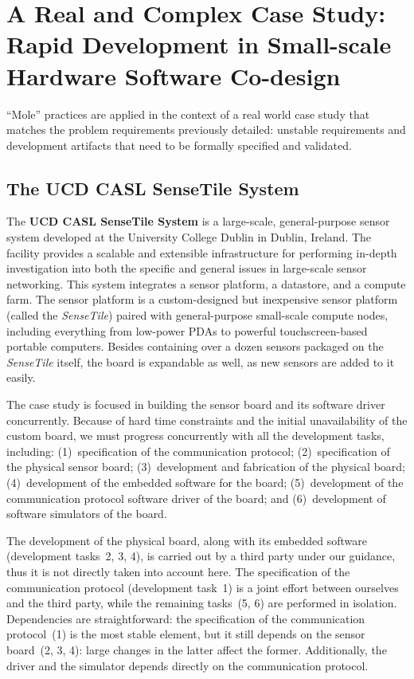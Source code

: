 \documentclass{article}
\newcommand{\ST}{\emph{SenseTile}\xspace}
\begin{document}
\section{A Real and Complex Case Study: \\ Rapid Development in Small-scale Hardware Software Co-design}
\label{subsec:a_real_and_complex_case_study}

``Mole'' practices are applied in the context of a real world case study that matches the problem requirements previously detailed: unstable requirements and development artifacts that need to be formally specified and validated.  

\subsection{The UCD CASL SenseTile System}
\label{sec:ucd-casl-sensetile}

The \textbf{UCD CASL SenseTile System} is a large-scale, general-purpose sensor system developed at the University College Dublin in Dublin, Ireland.  
The facility provides a scalable and extensible infrastructure for performing in-depth investigation into both the specific and general issues in large-scale sensor networking. 
This system integrates a sensor platform, a datastore, and a compute farm.  
The sensor platform is a custom-designed but inexpensive sensor platform (called the \ST) paired with general-purpose small-scale compute nodes, including everything from low-power PDAs to powerful touchscreen-based portable computers.  
Besides containing over a dozen sensors packaged on the \ST itself, the board is expandable as well, as new sensors are added to it easily.

The case study is focused in building the sensor board and its software driver concurrently.  
Because of hard time constraints and the initial unavailability of the custom board, we must progress concurrently with all the development tasks, including: (1)~specification of the communication protocol; (2)~specification of the physical sensor board; (3)~development and fabrication of the physical board; (4)~development of the embedded software for the board; (5)~development of the communication protocol software driver of the board; and (6)~development of software simulators of the board.

The development of the physical board, along with its embedded software (development tasks~2, 3, 4), is carried out by a third party under our guidance, thus it is not directly taken into account here. 
The specification of the communication protocol (development task~1) is a joint effort between ourselves and the third party, while the remaining tasks~(5, 6) are performed in isolation.  
Dependencies are straightforward: the specification of the communication protocol~(1) is the most stable element, but it still depends on the sensor board~(2, 3, 4): large changes in the latter affect the former.
Additionally, the driver and the simulator depends directly on the communication protocol.
\end{document}

